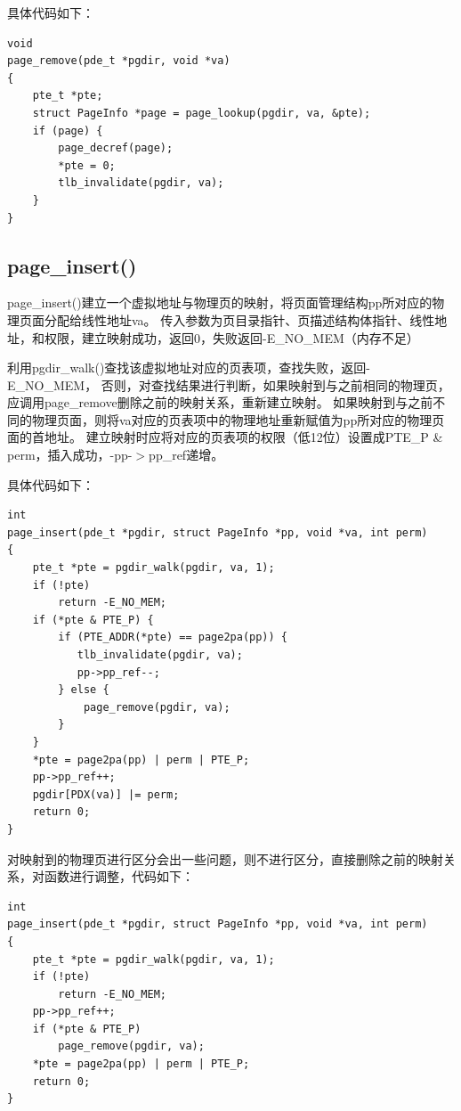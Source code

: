 \documentclass[12pt,a4paper,UTF8]{article}
\begin{document}
    具体代码如下：

    \begin{lstlisting}[style=CPP]
void
page_remove(pde_t *pgdir, void *va)
{
 	pte_t *pte;
    struct PageInfo *page = page_lookup(pgdir, va, &pte);
    if (page) {
        page_decref(page);
        *pte = 0;
        tlb_invalidate(pgdir, va);
    }
}
    \end{lstlisting}

    \subsection{page\_insert()}

    page\_insert()建立一个虚拟地址与物理页的映射，将页面管理结构pp所对应的物理页面分配给线性地址va。
    传入参数为页目录指针、页描述结构体指针、线性地址，和权限，建立映射成功，返回0，失败返回-E\_NO\_MEM（内存不足）

    利用pgdir\_walk()查找该虚拟地址对应的页表项，查找失败，返回-E\_NO\_MEM，
    否则，对查找结果进行判断，如果映射到与之前相同的物理页，应调用page\_remove删除之前的映射关系，重新建立映射。
    如果映射到与之前不同的物理页面，则将va对应的页表项中的物理地址重新赋值为pp所对应的物理页面的首地址。
    建立映射时应将对应的页表项的权限（低12位）设置成PTE\_P \& perm，插入成功，-pp-$>$pp\_ref递增。

    具体代码如下：

    \begin{lstlisting}[style=CPP]
int
page_insert(pde_t *pgdir, struct PageInfo *pp, void *va, int perm)
{
	pte_t *pte = pgdir_walk(pgdir, va, 1);
    if (!pte)
        return -E_NO_MEM;
   	if (*pte & PTE_P) {
        if (PTE_ADDR(*pte) == page2pa(pp)) {
           tlb_invalidate(pgdir, va);
           pp->pp_ref--;
        } else {
	        page_remove(pgdir, va);
  	    }
  	}
	*pte = page2pa(pp) | perm | PTE_P;
 	pp->pp_ref++;
  	pgdir[PDX(va)] |= perm;
	return 0;
}
    \end{lstlisting}

    对映射到的物理页进行区分会出一些问题，则不进行区分，直接删除之前的映射关系，对函数进行调整，代码如下：

    \begin{lstlisting}[style=CPP]
int 
page_insert(pde_t *pgdir, struct PageInfo *pp, void *va, int perm)
{
    pte_t *pte = pgdir_walk(pgdir, va, 1);
    if (!pte)
        return -E_NO_MEM;
    pp->pp_ref++;
    if (*pte & PTE_P)
        page_remove(pgdir, va);
    *pte = page2pa(pp) | perm | PTE_P;
    return 0;
}
    \end{lstlisting}
\end{document}
